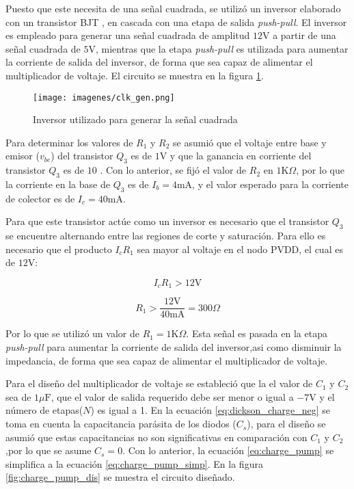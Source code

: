     Puesto que este necesita de una señal cuadrada, se utilizó un inversor
    elaborado con un transistor BJT , en cascada con una etapa de salida 
    \textit{push-pull}. El inversor es empleado para generar una señal
    cuadrada de amplitud $12\text{V}$ a partir de una señal cuadrada 
    de $5\text{V}$, mientras que la etapa \textit{push-pull}
    es utilizada para aumentar la corriente de salida del inversor, de forma
    que sea capaz de alimentar el multiplicador de voltaje. El circuito
    se muestra en la figura \ref{fig:inversor}.
    
    \begin{figure}[H]
        \centering
        \texttt{[image: imagenes/clk\_gen.png]}
        \caption{Inversor utilizado para generar la señal cuadrada}
        \label{fig:inversor}
    \end{figure}

    Para determinar los valores de $R_1$ y $R_2$
    se asumió que el voltaje entre base y emisor ($v_{be}$) del transistor $Q_3$
    es de $1\text{V}$  y que la ganancia en corriente del 
    transistor $Q_3$ es de $10$ \cite{mmtb5551}. Con lo anterior, se fijó el 
    valor de $R_2$ en $1\text{K}\Omega$, por 
    lo que la corriente en la base de $Q_3$ es de $I_b = 4\text{mA}$, y el valor
     esperado para la corriente de colector es de $I_c = 40\text{mA}$.

    Para que este transistor actúe como un inversor es necesario que 
    el transistor $Q_3$ se encuentre alternando entre
    las regiones de corte y saturación. Para ello es necesario
    que el producto $I_cR_1$ sea mayor al voltaje en el nodo PVDD, el cual
    es de $12\text{V}$:
    
    $$
        I_cR_1 > 12\text{V}
    $$
    
   
    $$
        R_1 > \frac{12\text{V}}{40\text{mA}} = 300 \Omega
    $$

    
    Por lo que se utilizó un valor de $R_1 = 1\text{K}\Omega$. Esta señal es 
    pasada en la etapa \textit{push-pull} para aumentar la corriente de salida
    del inversor,asi como disminuir la impedancia, de forma que sea 
    capaz de alimentar el multiplicador de voltaje.

    Para el diseño del multiplicador de voltaje se estableció que la 
    el valor de $C_1$ y $C_2$ sea de
    $1\mu\text{F}$, que el valor de salida requerido debe ser menor o igual
    a $-7\text{V}$ y el número de etapas($N$) es igual a 1. En la 
    ecuación \ref{eq:dickson_charge_neg}  se toma en cuenta la
    capacitancia parásita de los diodos ($C_s$), para el diseño se asumió
    que estas capacitancias no son significativas en comparación con 
    $C_1$ y $C_2$,por lo que se asume $C_s = 0$.
    Con lo anterior, la ecuación \ref{eq:charge_pump} se simplifica a la
    ecuación \ref{eq:charge_pump_simp}. En la figura \ref{fig:charge_pump_dis}
    se muestra el circuito diseñado.

